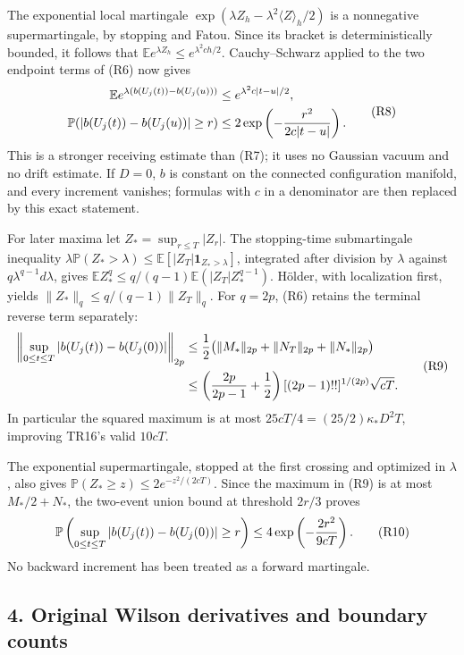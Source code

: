 \documentclass[11pt]{article}
\begin{document}
The exponential local martingale
\(\exp(\lambda Z_h-\lambda^2\langle Z\rangle_h/2)\) is a
nonnegative supermartingale, by stopping and Fatou. Since its bracket
is deterministically bounded, it follows that
\(\mathbb E e^{\lambda Z_h}\le e^{\lambda^2ch/2}\).
Cauchy–Schwarz applied to the two endpoint terms of (R6) now gives
\[
\begin{aligned}
 \mathbb E e^{\lambda(b(U_j(t))-b(U_j(u)))}
 &\le e^{\lambda^2c|t-u|/2},\\
 \mathbb P(|b(U_j(t))-b(U_j(u))|\ge r)
 &\le2\exp\left(-{r^2\over2c|t-u|}\right).
\end{aligned}\tag{R8}
\]
This is a stronger receiving estimate than (R7); it uses no
Gaussian vacuum and no drift estimate.
If \(D=0\), \(b\) is constant on the connected configuration manifold,
and every increment vanishes; formulas with \(c\) in a denominator
are then replaced by this exact statement.

For later maxima let \(Z_*=\sup_{r\le T}|Z_r|\).
The stopping-time submartingale inequality
\(\lambda\mathbb P(Z_*>\lambda)
\le\mathbb E[|Z_T|\mathbf1_{Z_*>\lambda}]\), integrated after
division by \(\lambda\) against \(q\lambda^{q-1}d\lambda\),
gives
\(\mathbb E Z_*^q\le q/(q-1)\mathbb E(|Z_T|Z_*^{q-1})\).
Hölder, with localization first, yields
\(\|Z_*\|_q\le q/(q-1)\|Z_T\|_q\).
For \(q=2p\), (R6) retains the terminal reverse term separately:
\[
\begin{aligned}
 \left\|\sup_{0\le t\le T}|b(U_j(t))-b(U_j(0))|\right\|_{2p}
 &\le {1\over2}\bigl(\|M_*\|_{2p}
             +\|N_T\|_{2p}+\|N_*\|_{2p}\bigr)\\
 &\le \left({2p\over2p-1}+{1\over2}\right)
 [(2p-1)!!]^{1/(2p)}\sqrt{cT}.
\end{aligned}\tag{R9}
\]
In particular the squared maximum is at most
\(25cT/4=(25/2)\kappa_*D^2T\), improving TR16's valid \(10cT\).

The exponential supermartingale, stopped at the first crossing and
optimized in \(\lambda\), also gives
\(\mathbb P(Z_*\ge z)\le2e^{-z^2/(2cT)}\).
Since the maximum in (R9) is at most \(M_*/2+N_*\), the two-event
union bound at threshold \(2r/3\) proves
\[
 \mathbb P\left(\sup_{0\le t\le T}
       |b(U_j(t))-b(U_j(0))|\ge r\right)
 \le4\exp\left(-{2r^2\over9cT}\right). \tag{R10}
\]
No backward increment has been treated as a forward martingale.

\subsection*{4. Original Wilson derivatives and boundary counts}
\end{document}
